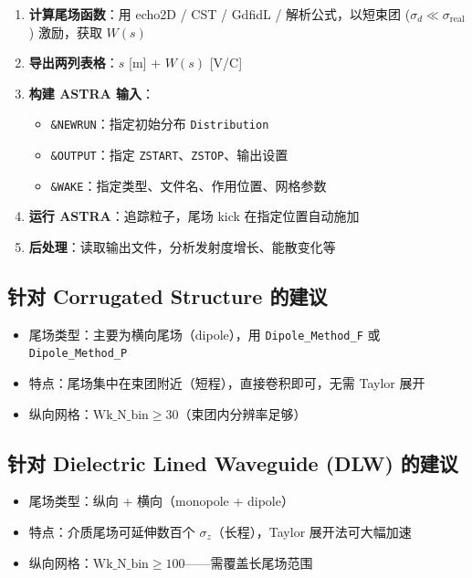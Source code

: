 \documentclass[a4paper,11pt]{article}
\begin{document}
\begin{enumerate}
  \item \textbf{计算尾场函数}：用 echo2D / CST / GdfidL / 解析公式，以短束团 ($\sigma_d \ll \sigma_{\text{real}}$) 激励，获取 $W(s)$
  \item \textbf{导出两列表格}：$s$ [m] + $W(s)$ [V/C]
  \item \textbf{构建 ASTRA 输入}：
        \begin{itemize}
          \item \texttt{\&NEWRUN}：指定初始分布 \texttt{Distribution}
          \item \texttt{\&OUTPUT}：指定 \texttt{ZSTART}、\texttt{ZSTOP}、输出设置
          \item \texttt{\&WAKE}：指定类型、文件名、作用位置、网格参数
        \end{itemize}
  \item \textbf{运行 ASTRA}：追踪粒子，尾场 kick 在指定位置自动施加
  \item \textbf{后处理}：读取输出文件，分析发射度增长、能散变化等
\end{enumerate}

\subsection{针对 Corrugated Structure 的建议}

\begin{itemize}
  \item 尾场类型：主要为横向尾场（dipole），用 \texttt{Dipole\_Method\_F} 或 \texttt{Dipole\_Method\_P}
  \item 特点：尾场集中在束团附近（短程），直接卷积即可，无需 Taylor 展开
  \item 纵向网格：$\text{Wk\_N\_bin} \ge 30$（束团内分辨率足够）
\end{itemize}

\subsection{针对 Dielectric Lined Waveguide (DLW) 的建议}

\begin{itemize}
  \item 尾场类型：纵向 + 横向（monopole + dipole）
  \item 特点：介质尾场可延伸数百个 $\sigma_z$（长程），Taylor 展开法可大幅加速
  \item 纵向网格：$\text{Wk\_N\_bin} \ge 100$——需覆盖长尾场范围
\end{itemize}
\end{document}
